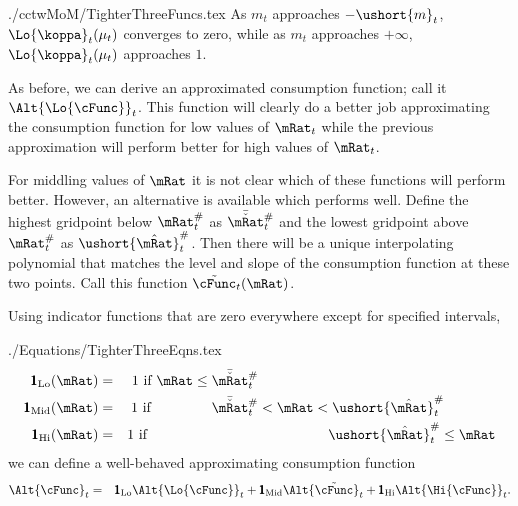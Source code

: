 \documentclass[titlepage]{\econtex}
\begin{document}
\begin{verbatimwrite}{./cctwMoM/TighterThreeFuncs.tex}
As $m_{t}$ approaches
$-\ushort{m}_{t}$, $\Lo{\koppa}_{t}(\mu_{t})$ converges to zero, while as $m_{t}$
approaches $+\infty$, $\Lo{\koppa}_{t}(\mu_{t})$ approaches $1$.  

As before, we can derive an approximated consumption function; call it
$\Alt{\Lo{\cFunc}}_{t}$.  This function will clearly do a better job approximating the consumption
function for low values of $\mRat_{t}$ while the previous approximation will perform better
for high values of $\mRat_{t}$.  

For middling values of $\mRat$ it is not clear which of these
functions will perform better.  However, an alternative is available
which performs well.  Define the highest gridpoint below $\mtCusp$ as
$\bar{\check{\mRat}}_{t}^{\#}$ and the lowest gridpoint above $\mtCusp$ as
$\ushort{\hat{\mRat}}_{t}^{\#}$.  Then there will be a unique interpolating
polynomial that matches the level and slope of the consumption function
at these two points.  Call this function $\tilde{\cFunc}_{t}(\mRat)$.  

Using indicator functions that are zero everywhere except for specified intervals,
\end{verbatimwrite}

\begin{verbatimwrite}{./Equations/TighterThreeEqns.tex}
\begin{eqnarray*}
    \pmb{1}_{\text{Lo}}(\mRat) & = & 1 \text{~if $          \mRat \leq  \bar{\check{\mRat}}_{t}^{\#} \phantom{< \mRat <   \ushort{\hat{\mRat}}_{t}^{\#}          \leq \mRat}$}
\\  \pmb{1}_{\text{Mid}}(\mRat) & = & 1 \text{~if $\phantom{ \mRat \leq}~ \bar{\check{\mRat}}_{t}^{\#}          < \mRat <   \ushort{\hat{\mRat}}_{t}^{\#} \phantom{\leq \mRat}$}
\\  \pmb{1}_{\text{Hi}}(\mRat) & = & 1 \text{~if $\phantom{ \mRat \leq  ~\bar{\check{\mRat}}_{t}^{\#}          < \mRat < } \ushort{\hat{\mRat}}_{t}^{\#}           \leq \mRat$}
\end{eqnarray*}
we can define a well-behaved approximating consumption function
\begin{eqnarray}
  \Alt{\cFunc}_{t} & = & \pmb{1}_{\text{Lo}} \Alt{\Lo{\cFunc}}_{t} + \pmb{1}_{\text{Mid}} \Alt{\tilde{\cFunc}}_{t}+\pmb{1}_{\text{Hi}} \Alt{\Hi{\cFunc}}_{t}.
\end{eqnarray}
\end{verbatimwrite}

\end{document}
